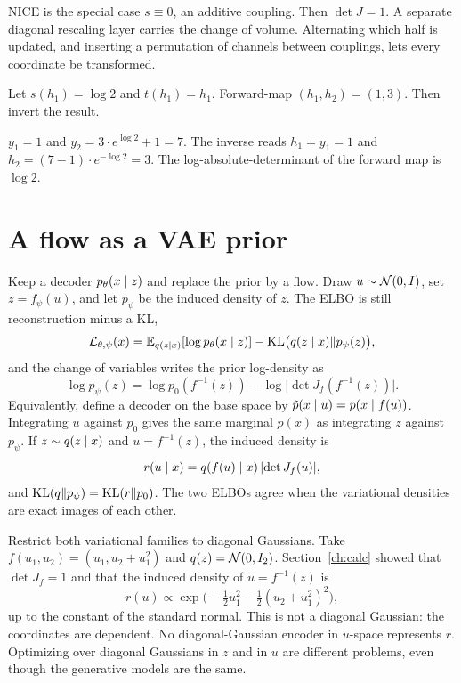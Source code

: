 NICE is the special case $s\equiv 0$, an additive coupling. Then $\det J=1$. A separate diagonal rescaling layer carries the change of volume. Alternating which half is updated, and inserting a permutation of channels between couplings, lets every coordinate be transformed.

\begin{practbox}
Let $s(h_1)=\log 2$ and $t(h_1)=h_1$. Forward-map $(h_1,h_2)=(1,3)$. Then invert the result.
\end{practbox}
\begin{solbox}
$y_1=1$ and $y_2=3\cdot e^{\log 2}+1=7$. The inverse reads $h_1=y_1=1$ and $h_2=(7-1)\cdot e^{-\log 2}=3$. The log-absolute-determinant of the forward map is $\log 2$.
\end{solbox}

\section{A flow as a VAE prior}

Keep a decoder $p_\theta(x\mid z)$ and replace the prior by a flow. Draw $u\sim\mathcal{N}(0,I)$, set $z=f_\psi(u)$, and let $p_\psi$ be the induced density of $z$. The ELBO is still reconstruction minus a KL,
\[
\mathcal L_{\theta,\psi}(x)
=\mathbb{E}_{q(z\mid x)}[\log p_\theta(x\mid z)]
-\mathrm{KL}\bigl(q(z\mid x)\Vert p_\psi(z)\bigr),
\]
and the change of variables writes the prior log-density as
\[
\log p_\psi(z)=\log p_0(f^{-1}(z))-\log\lvert\det J_f(f^{-1}(z))\rvert.
\]
Equivalently, define a decoder on the base space by $\tilde p(x\mid u)=p(x\mid f(u))$. Integrating $u$ against $p_0$ gives the same marginal $p(x)$ as integrating $z$ against $p_\psi$. If $z\sim q(z\mid x)$ and $u=f^{-1}(z)$, the induced density is
\[
r(u\mid x)=q(f(u)\mid x)\,\lvert\det J_f(u)\rvert,
\]
and $\mathrm{KL}(q\Vert p_\psi)=\mathrm{KL}(r\Vert p_0)$. The two ELBOs agree when the variational densities are exact images of each other.

\begin{pitbox}
Restrict both variational families to diagonal Gaussians. Take $f(u_1,u_2)=(u_1,u_2+u_1^2)$ and $q(z)=\mathcal{N}(0,I_2)$. Section~\ref{ch:calc} showed that $\det J_f=1$ and that the induced density of $u=f^{-1}(z)$ is
\[
r(u)\propto\exp\bigl(-\tfrac12 u_1^2-\tfrac12(u_2+u_1^2)^2\bigr),
\]
up to the constant of the standard normal. This is not a diagonal Gaussian: the coordinates are dependent. No diagonal-Gaussian encoder in $u$-space represents $r$. Optimizing over diagonal Gaussians in $z$ and in $u$ are different problems, even though the generative models are the same.
\end{pitbox}


